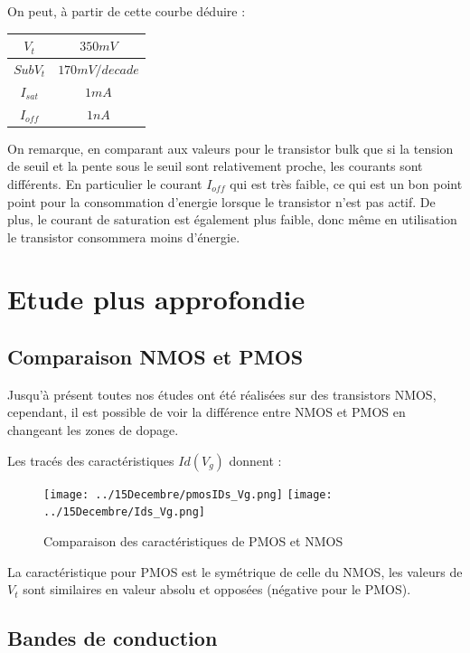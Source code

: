\documentclass[a4paper,11pt]{report}
\begin{document}
On peut, à partir de cette courbe déduire : 

\begin{tableau}[H]
\centering
\begin{tabular}{|c|c|}
\hline
$V_t$&$350mV$\\
\hline
$SubV_t$&$170mV/decade$\\
\hline
$I_{sat}$&$1mA$\\
\hline
$I_{off}$&$1 nA$\\
\hline
\end{tabular}
\caption{Caractéristiques du FDSOI avec $V_{ds}=1V$}
\end{tableau}

On remarque, en comparant aux valeurs pour le transistor bulk que si la tension de seuil et la pente sous le seuil sont relativement proche, les courants sont différents. En particulier le courant $I_{off}$ qui est très faible, ce qui est un bon point point pour la consommation d'energie lorsque le transistor n'est pas actif. De plus, le courant de saturation est également plus faible, donc même en utilisation le transistor consommera moins d'énergie.

\chapter{Etude plus approfondie}

\section{Comparaison NMOS et PMOS}

Jusqu'à présent toutes nos études ont été réalisées sur des transistors NMOS, cependant, il est possible de voir la différence entre NMOS et PMOS en changeant les zones de dopage. 

Les tracés des caractéristiques $Id(V_g)$ donnent : 

\begin{figure}[H]
\centering
\texttt{[image: ../15Decembre/pmosIDs\_Vg.png]}
\texttt{[image: ../15Decembre/Ids\_Vg.png]}
\caption{Comparaison des caractéristiques de PMOS et NMOS}
\end{figure}

La caractéristique pour PMOS est le symétrique de celle du NMOS, les valeurs de $V_t$ sont similaires en valeur absolu et opposées (négative pour le PMOS).

\section{Bandes de conduction}
\end{document}
